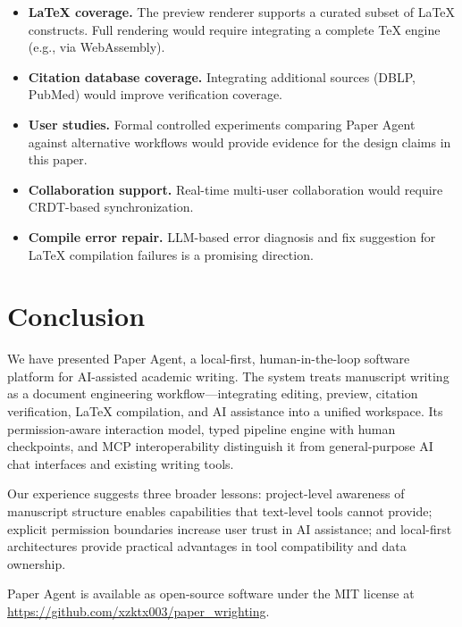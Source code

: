 \documentclass[11pt,a4paper]{article}
\newcommand{\software}{Paper Agent}
\newcommand{\repo}{\url{https://github.com/xzktx003/paper_wrighting}}
\begin{document}
\begin{itemize}
  \item \textbf{\LaTeX{} coverage.} The preview renderer supports a curated
  subset of \LaTeX{} constructs. Full rendering would require integrating a
  complete \TeX{} engine (e.g., via WebAssembly).

  \item \textbf{Citation database coverage.} Integrating additional sources
  (DBLP, PubMed) would improve verification coverage.

  \item \textbf{User studies.} Formal controlled experiments comparing
  \software{} against alternative workflows would provide evidence for the
  design claims in this paper.

  \item \textbf{Collaboration support.} Real-time multi-user collaboration
  would require CRDT-based synchronization.

  \item \textbf{Compile error repair.} LLM-based error diagnosis and fix
  suggestion for \LaTeX{} compilation failures is a promising direction.
\end{itemize}

\section{Conclusion}

We have presented \software{}, a local-first, human-in-the-loop software
platform for AI-assisted academic writing. The system treats manuscript writing
as a document engineering workflow---integrating editing, preview, citation
verification, \LaTeX{} compilation, and AI assistance into a unified workspace.
Its permission-aware interaction model, typed pipeline engine with human
checkpoints, and MCP interoperability distinguish it from general-purpose AI
chat interfaces and existing writing tools.

Our experience suggests three broader lessons: project-level awareness of
manuscript structure enables capabilities that text-level tools cannot provide;
explicit permission boundaries increase user trust in AI assistance; and
local-first architectures provide practical advantages in tool compatibility
and data ownership.

\software{} is available as open-source software under the MIT license at
\repo{}.
\end{document}
